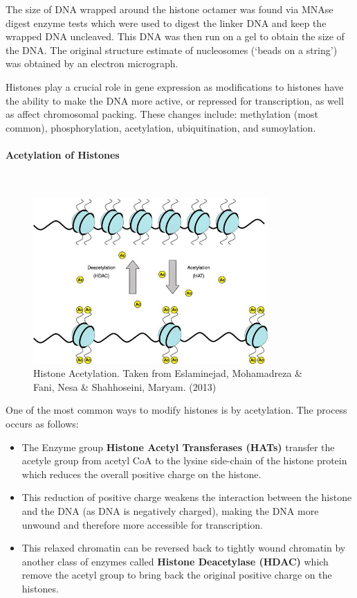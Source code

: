 \documentclass[letterpaper,12pt]{article}
\begin{document}
The size of DNA wrapped around the histone octamer was found via MNAse digest enzyme tests which were used to digest the linker DNA and keep the wrapped DNA uncleaved. This DNA was then run on a gel to obtain the size of the DNA. The original structure estimate of nucleosomes (`beads on a string') was obtained by an electron micrograph.\vspace{1em}

Histones play a crucial role in gene expression as modifications to histones have the ability to make the DNA more active, or repressed for transcription, as well as affect chromosomal packing. These changes include: methylation (most common), phosphorylation, acetylation, ubiquitination, and sumoylation.

\paragraph{Acetylation of Histones}\mbox{}\\
\begin{figure}[!h]
	\centering
	\includegraphics[width=0.8\textwidth]{figures/histone_acetylation.jpeg}
	\caption{Histone Acetylation. Taken from Eslaminejad, Mohamadreza \& Fani, Nesa \& Shahhoseini, Maryam. (2013)}\label{fig4}
\end{figure}

One of the most common ways to modify histones is by acetylation. The process occurs as follows:
\begin{itemize}
	\item The Enzyme group \textbf{Histone Acetyl Transferases (HATs)} transfer the acetyle group from acetyl CoA to the lysine side-chain of the histone protein which reduces the overall positive charge on the histone\cite{Bannister_Kouzarides_2011}.
	\item This reduction of positive charge weakens the interaction between the histone and the DNA (as DNA is negatively charged), making the DNA more unwound and therefore more accessible for transcription.
	\item This relaxed chromatin can be reversed back to tightly wound chromatin by another class of enzymes called \textbf{Histone Deacetylase (HDAC)} which remove the acetyl group to bring back the original positive charge on the histones.
\end{itemize}
\end{document}
